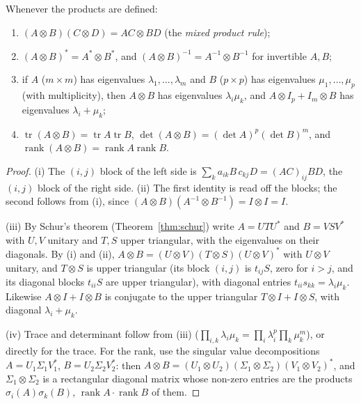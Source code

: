 \begin{proposition}\label{prop:kronecker}
Whenever the products are defined:
\begin{enumerate}[label=(\roman*)]
\item $(A\otimes B)(C\otimes D)=AC\otimes BD$ (the \emph{mixed product rule});
\item $(A\otimes B)^*=A^*\otimes B^*$, and $(A\otimes B)^{-1}=A^{-1}\otimes B^{-1}$ for invertible $A,B$;
\item if $A$ ($m\times m$) has eigenvalues $\lambda_1,\dots,\lambda_m$ and $B$ ($p\times p$) has eigenvalues $\mu_1,\dots,\mu_p$ (with
multiplicity), then $A\otimes B$ has eigenvalues $\lambda_i\mu_k$, and $A\otimes I_p+I_m\otimes B$ has eigenvalues $\lambda_i+\mu_k$;
\item $\operatorname{tr}(A\otimes B)=\operatorname{tr}A\operatorname{tr}B$, $\det(A\otimes B)=(\det A)^p(\det B)^m$, and
$\operatorname{rank}(A\otimes B)=\operatorname{rank}A\operatorname{rank}B$.
\end{enumerate}
\end{proposition}
\begin{proof}
(i) The $(i,j)$ block of the left side is $\sum_ka_{ik}B\,c_{kj}D=(AC)_{ij}BD$, the $(i,j)$ block of the right side. (ii) The
first identity is read off the blocks; the second follows from (i), since $(A\otimes B)(A^{-1}\otimes B^{-1})=I\otimes I=I$.

(iii) By Schur's theorem (Theorem~\ref{thm:schur}) write $A=UTU^*$ and $B=VSV^*$ with $U,V$ unitary and $T,S$ upper triangular, with
the eigenvalues on their diagonals. By (i) and (ii), $A\otimes B=(U\otimes V)(T\otimes S)(U\otimes V)^*$ with $U\otimes V$ unitary,
and $T\otimes S$ is upper triangular (its block $(i,j)$ is $t_{ij}S$, zero for $i>j$, and its diagonal blocks $t_{ii}S$ are upper
triangular), with diagonal entries $t_{ii}s_{kk}=\lambda_i\mu_k$. Likewise $A\otimes I+I\otimes B$ is conjugate to the upper
triangular $T\otimes I+I\otimes S$, with diagonal $\lambda_i+\mu_k$.

(iv) Trace and determinant follow from (iii) ($\prod_{i,k}\lambda_i\mu_k=\prod_i\lambda_i^p\prod_k\mu_k^m$), or directly for the
trace. For the rank, use the singular value decompositions $A=U_1\Sigma_1V_1^*$, $B=U_2\Sigma_2V_2^*$: then $A\otimes B=(U_1\otimes U_2)
(\Sigma_1\otimes\Sigma_2)(V_1\otimes V_2)^*$, and $\Sigma_1\otimes\Sigma_2$ is a rectangular diagonal matrix whose non-zero entries are the
products $\sigma_i(A)\sigma_k(B)$, $\operatorname{rank}A\cdot\operatorname{rank}B$ of them.
\end{proof}

